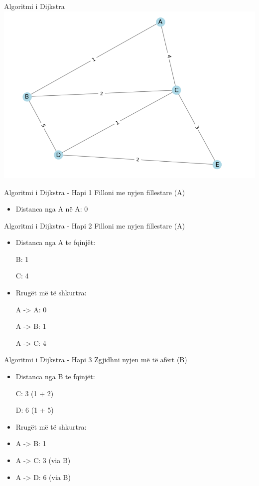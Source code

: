 \documentclass[
  ignorenonframetext,
]{beamer}
\providecommand{\tightlist}{%
  \setlength{\itemsep}{0pt}\setlength{\parskip}{0pt}}
\begin{document}
\begin{frame}{Algoritmi i Dijkstra}
\protect\hypertarget{algoritmi-i-dijkstra-1}{}
\includegraphics{./Figs/dijkstra1.png}
\end{frame}

\begin{frame}{Algoritmi i Dijkstra - Hapi 1}
\protect\hypertarget{algoritmi-i-dijkstra---hapi-1}{}
Filloni me nyjen fillestare (A)

\begin{itemize}
\tightlist
\item
  Distanca nga A në A: 0
\end{itemize}
\end{frame}

\begin{frame}{Algoritmi i Dijkstra - Hapi 2}
\protect\hypertarget{algoritmi-i-dijkstra---hapi-2}{}
Filloni me nyjen fillestare (A)

\begin{itemize}
\item
  Distanca nga A te fqinjët:

  B: 1

  C: 4
\item
  Rrugët më të shkurtra:

  A -\textgreater{} A: 0

  A -\textgreater{} B: 1

  A -\textgreater{} C: 4
\end{itemize}
\end{frame}

\begin{frame}{Algoritmi i Dijkstra - Hapi 3}
\protect\hypertarget{algoritmi-i-dijkstra---hapi-3}{}
Zgjidhni nyjen më të afërt (B)

\begin{itemize}
\item
  Distanca nga B te fqinjët:

  C: 3 (1 + 2)

  D: 6 (1 + 5)
\item
  Rrugët më të shkurtra:
\item
  A -\textgreater{} B: 1
\item
  A -\textgreater{} C: 3 (via B)
\item
  A -\textgreater{} D: 6 (via B)
\end{itemize}
\end{frame}
\end{document}
